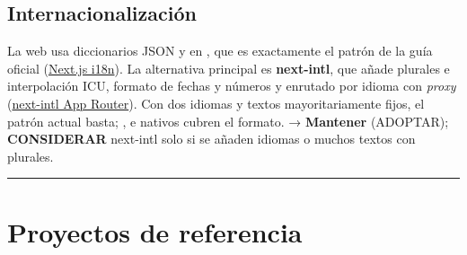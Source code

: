 \subsection{Internacionalización}

La web usa diccionarios JSON y  en , que es exactamente el patrón de la guía oficial (\href{https://nextjs.org/docs/app/guides/internationalization}{Next.js i18n}). La alternativa principal es \textbf{next-intl}, que añade plurales e interpolación ICU, formato de fechas y números y enrutado por idioma con \emph{proxy} (\href{https://next-intl.dev/docs/getting-started/app-router}{next-intl App Router}). Con dos idiomas y textos mayoritariamente fijos, el patrón actual basta; ,  e  nativos cubren el formato. → \textbf{Mantener} (ADOPTAR); \textbf{CONSIDERAR} next-intl solo si se añaden idiomas o muchos textos con plurales.

\medskip\noindent\textcolor{muted!40}{\rule{\linewidth}{0.3pt}}\medskip

\section{Proyectos de referencia}

